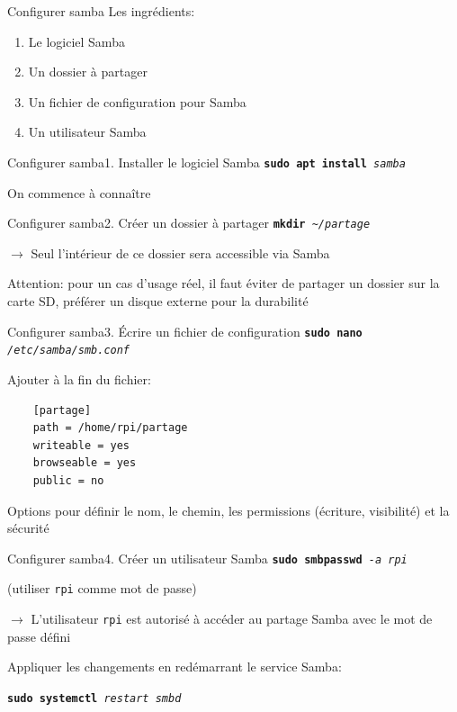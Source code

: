 \documentclass[
aspectratio=169 %
]{beamer}
\newcommand{\cmd}[1]{\texttt{\textbf{#1}}}
\newcommand{\args}[1]{\texttt{\textit{#1}}}
\begin{document}
\begin{frame}{Configurer samba}
    Les ingrédients:
    \begin{enumerate}
        \item Le logiciel Samba
        \item Un dossier à partager
        \item Un fichier de configuration pour Samba
        \item Un utilisateur Samba
    \end{enumerate}
\end{frame}

\begin{frame}{Configurer samba}{1. Installer le logiciel Samba}
    \cmd{sudo apt install}\args{ samba}

    \bigskip
    On commence à connaître
\end{frame}

\begin{frame}{Configurer samba}{2. Créer un dossier à partager}
    \cmd{mkdir}\args{ \textasciitilde/partage}

    \bigskip
    \(\rightarrow\) Seul l'intérieur de ce dossier sera accessible via Samba

    \bigskip
    \alert{Attention:} pour un cas d'usage réel, il faut éviter de partager un
    dossier sur la carte SD, préférer un disque externe pour la durabilité
\end{frame}

\begin{frame}[fragile]{Configurer samba}{3. Écrire un fichier de configuration}
    \cmd{sudo nano}\args{ /etc/samba/smb.conf}

    \bigskip
    Ajouter à la fin du fichier:

    \begin{verbatim}
    [partage]
    path = /home/rpi/partage
    writeable = yes
    browseable = yes
    public = no
    \end{verbatim}

    Options pour définir le nom, le chemin, les permissions (écriture,
    visibilité) et la sécurité
\end{frame}

\begin{frame}{Configurer samba}{4. Créer un utilisateur Samba}
    \cmd{sudo smbpasswd}\args{ -a rpi}

    (utiliser \texttt{rpi} comme mot de passe)

    \bigskip
    \(\rightarrow\) L'utilisateur \texttt{rpi} est autorisé à accéder au
    partage Samba avec le mot de passe défini

    \bigskip
    \bigskip
    Appliquer les changements en redémarrant le service Samba:

    \cmd{sudo systemctl}\args{ restart smbd}
\end{frame}
\end{document}
